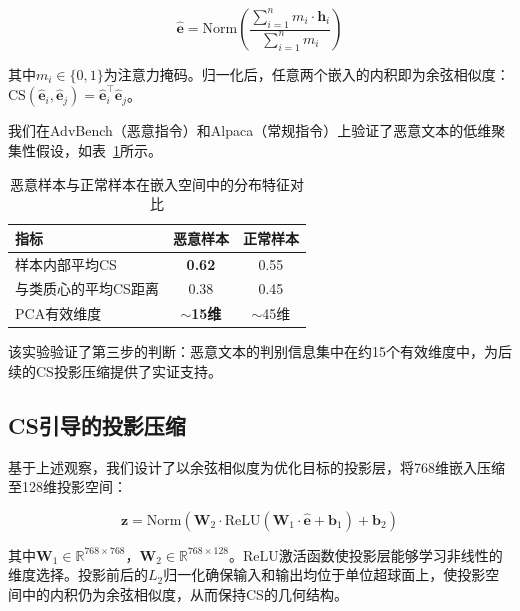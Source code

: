 \begin{equation}
\hat{\mathbf{e}} = \text{Norm}\left(\frac{\sum_{i=1}^{n} m_i \cdot \mathbf{h}_i}{\sum_{i=1}^{n} m_i}\right)
\label{eq:embedding}
\end{equation}

\noindent 其中$m_i \in \{0, 1\}$为注意力掩码。归一化后，任意两个嵌入的内积即为余弦相似度：$\text{CS}(\hat{\mathbf{e}}_i, \hat{\mathbf{e}}_j) = \hat{\mathbf{e}}_i^\top \hat{\mathbf{e}}_j$。

我们在AdvBench（恶意指令）和Alpaca（常规指令）上验证了恶意文本的低维聚集性假设，如表~\ref{tab:clustering}所示。

\begin{table}[t]
\centering
\caption{恶意样本与正常样本在嵌入空间中的分布特征对比}
\label{tab:clustering}
\begin{tabular}{lcc}
\toprule
\textbf{指标} & \textbf{恶意样本} & \textbf{正常样本} \\
\midrule
样本内部平均CS & \textbf{0.62} & 0.55 \\
与类质心的平均CS距离 & 0.38 & 0.45 \\
PCA有效维度 & \textbf{$\sim$15维} & $\sim$45维 \\
\bottomrule
\end{tabular}
\end{table}

\noindent 该实验验证了第三步的判断：恶意文本的判别信息集中在约15个有效维度中，为后续的CS投影压缩提供了实证支持。


\subsection{CS引导的投影压缩}

基于上述观察，我们设计了以余弦相似度为优化目标的投影层，将768维嵌入压缩至128维投影空间：

\begin{equation}
\mathbf{z} = \text{Norm}\left(\mathbf{W}_2 \cdot \text{ReLU}(\mathbf{W}_1 \cdot \hat{\mathbf{e}} + \mathbf{b}_1) + \mathbf{b}_2\right)
\label{eq:projection}
\end{equation}

\noindent 其中$\mathbf{W}_1 \in \mathbb{R}^{768 \times 768}$，$\mathbf{W}_2 \in \mathbb{R}^{768 \times 128}$。ReLU激活函数使投影层能够学习非线性的维度选择。投影前后的$L_2$归一化确保输入和输出均位于单位超球面上，使投影空间中的内积仍为余弦相似度，从而保持CS的几何结构。

